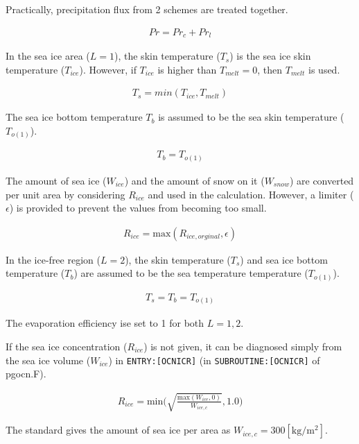 Practically, precipitation flux from 2 schemes are treated together.

\begin{eqnarray}
    Pr = Pr_c + Pr_l
\end{eqnarray}

In the sea ice area (\(L=1\)), the skin temperature (\(T_s\)) is the sea
ice skin temperature (\(T_{ice}\)). However, if \(T_{ice}\) is higher
than \(T_{melt}=0\), then \(T_{melt}\) is used.

\begin{eqnarray}
    T_s = min(T_{ice},T_{melt})
\end{eqnarray}

The sea ice bottom temperature \(T_b\) is assumed to be the sea skin
temperature (\(T_{o(1)}\)).

\begin{eqnarray}
    T_b = T_{o(1)}
\end{eqnarray}

The amount of sea ice (\(W_{ice}\)) and the amount of snow on it
(\(W_{snow}\)) are converted per unit area by considering \(R_{ice}\)
and used in the calculation. However, a limiter (\(\epsilon\)) is
provided to prevent the values from becoming too small.

\begin{eqnarray}
R_{ice} =\mathrm{max}( R_{ice,orginal}, \epsilon)
\end{eqnarray}

In the ice-free region (\(L=2\)), the skin temperature (\(T_s\)) and sea
ice bottom temperature (\(T_b\)) are assumed to be the sea temperature
temperature (\(T_{o(1)}\)).

\begin{eqnarray}
    T_s = T_b = T_{o(1)}
\end{eqnarray}

The evaporation efficiency ise set to 1 for both \(L=1, 2\).

If the sea ice concentration (\(R_{ice}\)) is not given, it can be
diagnosed simply from the sea ice volume (\(W_{ice}\)) in
\texttt{ENTRY:{[}OCNICR{]}} (in \texttt{SUBROUTINE:{[}OCNICR{]}} of
pgocn.F).

\begin{eqnarray}
R_{ice} = \mathrm{min}\Big(\sqrt{\frac{\mathrm{max}(W_{ice},0)}{W_{ice,c}}},1.0\Big)
\end{eqnarray}

The standard gives the amount of sea ice per area as
\(W_{ice,c}=300 \mathrm{[kg/m^2]}\).

